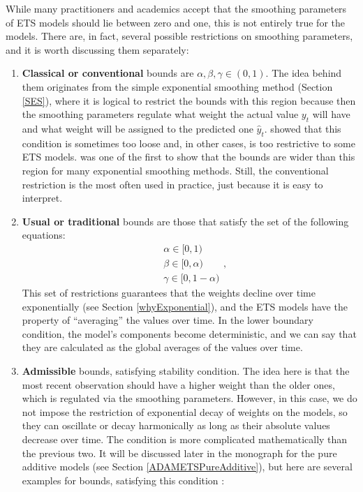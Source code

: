 \documentclass[]{book}
\theoremstyle{definition}
\theoremstyle{definition}
\theoremstyle{definition}
\theoremstyle{definition}
\theoremstyle{remark}
\begin{document}
While many practitioners and academics accept that the smoothing parameters of ETS models should lie between zero and one, this is not entirely true for the models. There are, in fact, several possible restrictions on smoothing parameters, and it is worth discussing them separately:

\begin{enumerate}
\def\labelenumi{\arabic{enumi}.}
\item
  \textbf{Classical or conventional} bounds are \(\alpha, \beta, \gamma \in (0,1)\). The idea behind them originates from the simple exponential smoothing method (Section \ref{SES}), where it is logical to restrict the bounds with this region because then the smoothing parameters regulate what weight the actual value \(y_t\) will have and what weight will be assigned to the predicted one \(\hat{y}_t\). \citet{Hyndman2008b} showed that this condition is sometimes too loose and, in other cases, is too restrictive to some ETS models. \citet{Brenner1968} was one of the first to show that the bounds are wider than this region for many exponential smoothing methods. Still, the conventional restriction is the most often used in practice, just because it is easy to interpret.
\item
  \textbf{Usual or traditional} bounds are those that satisfy the set of the following equations:
  \begin{equation}
    \begin{aligned}
    &\alpha \in [0, 1)\\
    &\beta \in [0, \alpha) \\
    &\gamma \in [0, 1-\alpha)
    \end{aligned},
    \label{eq:ETSUsualBounds}
  \end{equation}
  This set of restrictions guarantees that the weights decline over time exponentially (see Section \ref{whyExponential}), and the ETS models have the property of ``averaging'' the values over time. In the lower boundary condition, the model's components become deterministic, and we can say that they are calculated as the global averages of the values over time.
\item
  \textbf{Admissible} bounds, satisfying stability condition. The idea here is that the most recent observation should have a higher weight than the older ones, which is regulated via the smoothing parameters. However, in this case, we do not impose the restriction of exponential decay of weights on the models, so they can oscillate or decay harmonically as long as their absolute values decrease over time. The condition is more complicated mathematically than the previous two. It will be discussed later in the monograph for the pure additive models (see Section \ref{ADAMETSPureAdditive}), but here are several examples for bounds, satisfying this condition \citep[from Chapter 10 of][]{Hyndman2008b}:
\end{enumerate}
\end{document}

